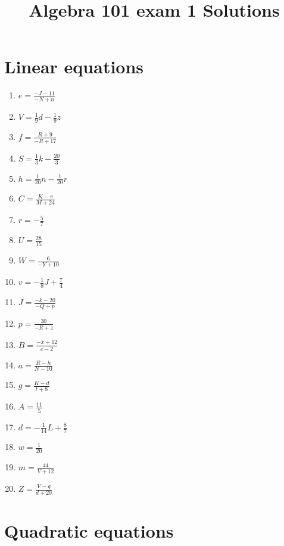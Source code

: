 \documentclass{article}
\begin{document}
    \title{Algebra 101 exam 1 Solutions} 
 \date{\vspace{-5ex}} 
 \maketitle

    \section{Linear equations}
    
    \begin{multicols}{2}
    \begin{enumerate}
    \item$e =\frac{- J -11}{- N + n}$
\item$V =\frac{1}{9} d - \frac{1}{9} z$
\item$f =\frac{R + 9}{- R + 17}$
\item$S =\frac{1}{3} k - \frac{20}{3}$
\item$h =\frac{1}{20} n - \frac{1}{20} r$
\item$C =\frac{K - v}{M + 24}$
\item$r =- \frac{5}{7}$
\item$U =\frac{28}{15}$
\item$W =\frac{6}{- Y + 10}$
\item$v =- \frac{1}{8} J + \frac{7}{4}$
\item$J =\frac{- k -20}{- Q + p}$
\item$p =\frac{30}{- R + z}$
\item$B =\frac{- x + 12}{c -2}$
\item$a =\frac{R - h}{N -10}$
\item$g =\frac{K - d}{t + 8}$
\item$A =\frac{11}{5}$
\item$d =- \frac{1}{14} L + \frac{8}{7}$
\item$w =\frac{1}{20}$
\item$m =\frac{44}{V + 12}$
\item$Z =\frac{V - g}{d + 20}$
    \end{enumerate}
    \end{multicols}
    

    \section{Quadratic equations}
    
\end{document}
